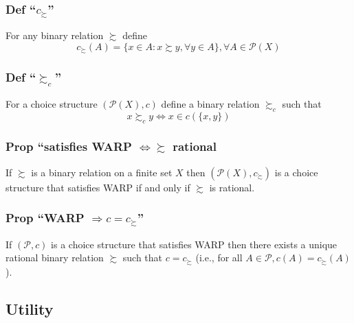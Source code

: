 \documentclass[
]{article}
\begin{document}
\hypertarget{def-c_succsim}{%
\subsubsection{\texorpdfstring{Def
``\(c_\succsim\)''}{Def ``c\_\textbackslash succsim''}}\label{def-c_succsim}}

For any binary relation \(\succsim\) define
\[c_\succsim(A) = \{x \in A: x \succsim y, \forall y \in A\}, \forall A \in \mathcal{P}(X)\]

\hypertarget{def-succsim_c}{%
\subsubsection{\texorpdfstring{Def
``\(\succsim_c\)''}{Def ``\textbackslash succsim\_c''}}\label{def-succsim_c}}

For a choice structure \((\mathcal{P}(X), c)\) define a binary relation
\(\succsim_c\) such that \[x \succsim_c y \iff x \in c(\{x,y\})\]

\hypertarget{prop-satisfies-warp-iff-succsim-rational}{%
\subsubsection{\texorpdfstring{Prop ``satisfies WARP \(\iff \succsim\)
rational}{Prop ``satisfies WARP \textbackslash iff \textbackslash succsim rational}}\label{prop-satisfies-warp-iff-succsim-rational}}

If \(\succsim\) is a binary relation on a finite set \(X\) then
\((\mathcal{P}(X), c_\succsim)\) is a choice structure that satisfies
WARP if and only if \(\succsim\) is rational.

\hypertarget{prop-warp-rightarrow-cc_succsim}{%
\subsubsection{\texorpdfstring{Prop ``WARP
\(\Rightarrow c=c_\succsim\)''}{Prop ``WARP \textbackslash Rightarrow c=c\_\textbackslash succsim''}}\label{prop-warp-rightarrow-cc_succsim}}

If \((\mathcal{P}, c)\) is a choice structure that satisfies WARP then
there exists a unique rational binary relation \(\succsim\) such that
\(c=c_\succsim\) (i.e., for all
\(A \in \mathcal{P}, c(A) = c_\succsim (A)\)).

\hypertarget{utility}{%
\subsection{Utility}\label{utility}}
\end{document}
